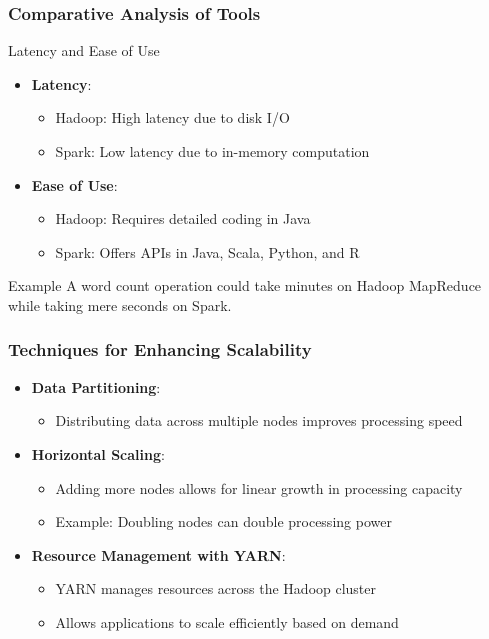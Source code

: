 \documentclass[aspectratio=169]{beamer}
\begin{document}
\begin{frame}
    \frametitle{Comparative Analysis of Tools}
    \begin{block}{Latency and Ease of Use}
        \begin{itemize}
            \item \textbf{Latency}:
                \begin{itemize}
                    \item Hadoop: High latency due to disk I/O
                    \item Spark: Low latency due to in-memory computation
                \end{itemize}
            \item \textbf{Ease of Use}:
                \begin{itemize}
                    \item Hadoop: Requires detailed coding in Java
                    \item Spark: Offers APIs in Java, Scala, Python, and R
                \end{itemize}
        \end{itemize}
        \begin{block}{Example}
            A word count operation could take minutes on Hadoop MapReduce while taking mere seconds on Spark.
        \end{block}
    \end{block}
\end{frame}

\begin{frame}
    \frametitle{Techniques for Enhancing Scalability}
    \begin{itemize}
        \item \textbf{Data Partitioning}:
            \begin{itemize}
                \item Distributing data across multiple nodes improves processing speed
            \end{itemize}
        \item \textbf{Horizontal Scaling}:
            \begin{itemize}
                \item Adding more nodes allows for linear growth in processing capacity
                \item Example: Doubling nodes can double processing power
            \end{itemize}
        \item \textbf{Resource Management with YARN}:
            \begin{itemize}
                \item YARN manages resources across the Hadoop cluster
                \item Allows applications to scale efficiently based on demand
            \end{itemize}
    \end{itemize}
\end{frame}
\end{document}
